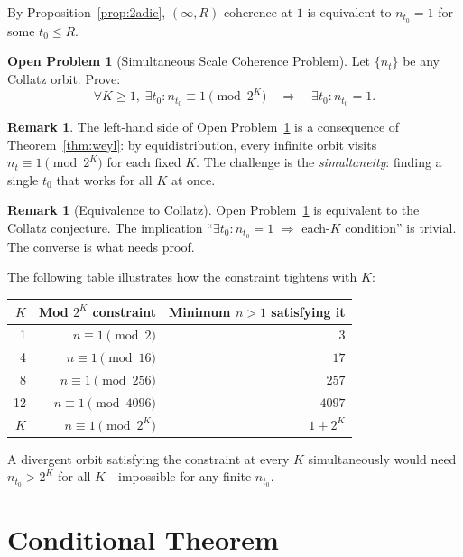 \documentclass[12pt]{article}
\theoremstyle{definition}
\newtheorem{remark}[theorem]{Remark}
\newtheorem{openproblem}[theorem]{Open Problem}
\begin{document}
By Proposition~\ref{prop:2adic}, $(\infty,R)$-coherence at $1$ is equivalent to $n_{t_0} = 1$ for some $t_0 \leq R$.

\begin{openproblem}[Simultaneous Scale Coherence Problem]
\label{prob:ssc}
Let $\{n_t\}$ be any Collatz orbit. Prove:
\[
  \forall K \geq 1,\; \exists t_0 : n_{t_0} \equiv 1 \pmod{2^K} \quad\Longrightarrow\quad \exists t_0 : n_{t_0} = 1.
\]
\end{openproblem}

\begin{remark}
The left-hand side of Open Problem~\ref{prob:ssc} is a consequence of Theorem~\ref{thm:weyl}: by equidistribution, every infinite orbit visits $n_t \equiv 1 \pmod{2^K}$ for each fixed $K$. The challenge is the \emph{simultaneity}: finding a single $t_0$ that works for all $K$ at once.
\end{remark}

\begin{remark}[Equivalence to Collatz]
Open Problem~\ref{prob:ssc} is equivalent to the Collatz conjecture. The implication ``$\exists t_0: n_{t_0} = 1$ $\Rightarrow$ each-$K$ condition'' is trivial. The converse is what needs proof.
\end{remark}

The following table illustrates how the constraint tightens with $K$:

\begin{center}
\begin{tabular}{@{}rrr@{}}
\toprule
$K$ & Mod $2^K$ constraint & Minimum $n > 1$ satisfying it \\
\midrule
 1 &  $n \equiv 1 \pmod{2}$   & $3$ \\
 4 &  $n \equiv 1 \pmod{16}$  & $17$ \\
 8 &  $n \equiv 1 \pmod{256}$ & $257$ \\
12 &  $n \equiv 1 \pmod{4096}$ & $4097$ \\
$K$ &  $n \equiv 1 \pmod{2^K}$ & $1 + 2^K$ \\
\bottomrule
\end{tabular}
\end{center}

A divergent orbit satisfying the constraint at every $K$ simultaneously would need $n_{t_0} > 2^K$ for all $K$---impossible for any finite $n_{t_0}$.

\section{Conditional Theorem}
\label{sec:conditional}
\end{document}
